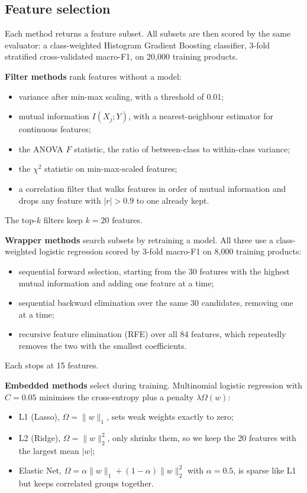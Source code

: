 \documentclass[conference]{IEEEtran}
\begin{document}
\subsection{Feature selection}
Each method returns a feature subset. All subsets are then scored by the same evaluator: a class-weighted Histogram Gradient Boosting classifier, 3-fold stratified cross-validated macro-F1, on 20,000 training products.

\textbf{Filter methods} rank features without a model:
\begin{itemize}
    \item variance after min-max scaling, with a threshold of 0.01;
    \item mutual information $I(X_j;Y)$, with a nearest-neighbour estimator for continuous features;
    \item the ANOVA $F$ statistic, the ratio of between-class to within-class variance;
    \item the $\chi^2$ statistic on min-max-scaled features;
    \item a correlation filter that walks features in order of mutual information and drops any feature with $|r| > 0.9$ to one already kept.
\end{itemize}
The top-$k$ filters keep $k=20$ features.

\textbf{Wrapper methods} search subsets by retraining a model. All three use a class-weighted logistic regression scored by 3-fold macro-F1 on 8,000 training products:
\begin{itemize}
    \item sequential forward selection, starting from the 30 features with the highest mutual information and adding one feature at a time;
    \item sequential backward elimination over the same 30 candidates, removing one at a time;
    \item recursive feature elimination (RFE) over all 84 features, which repeatedly removes the two with the smallest coefficients.
\end{itemize}
Each stops at 15 features.

\textbf{Embedded methods} select during training. Multinomial logistic regression with $C=0.05$ minimises the cross-entropy plus a penalty $\lambda \Omega(w)$:
\begin{itemize}
    \item L1 (Lasso), $\Omega = \|w\|_1$, sets weak weights exactly to zero;
    \item L2 (Ridge), $\Omega = \|w\|_2^2$, only shrinks them, so we keep the 20 features with the largest mean $|w|$;
    \item Elastic Net, $\Omega = \alpha\|w\|_1 + (1-\alpha)\|w\|_2^2$ with $\alpha = 0.5$, is sparse like L1 but keeps correlated groups together.
\end{itemize}
\end{document}
